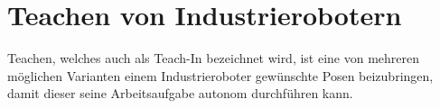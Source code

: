 














\section{Teachen von Industrierobotern}
Teachen, welches auch als Teach-In bezeichnet wird, ist eine von mehreren möglichen Varianten einem Industrieroboter gewünschte Posen beizubringen, damit dieser seine Arbeitsaufgabe autonom durchführen kann.

